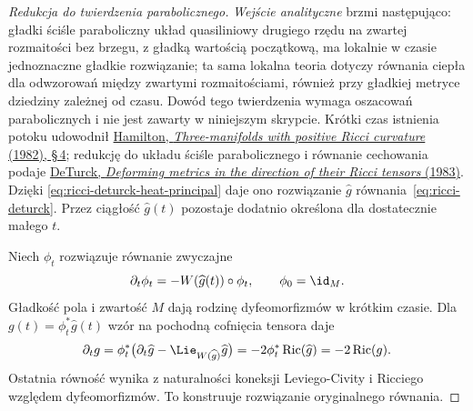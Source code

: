 \begin{proof}[Redukcja do twierdzenia parabolicznego]
\emph{Wejście analityczne} brzmi następująco: gładki
ściśle paraboliczny układ quasiliniowy drugiego rzędu
na zwartej rozmaitości bez brzegu, z gładką wartością
początkową, ma lokalnie w czasie jednoznaczne gładkie
rozwiązanie; ta sama lokalna teoria dotyczy równania
ciepła dla odwzorowań między zwartymi rozmaitościami,
również przy gładkiej metryce dziedziny zależnej od czasu.
Dowód tego twierdzenia wymaga oszacowań parabolicznych
i nie jest zawarty w niniejszym skrypcie. Krótki czas
istnienia potoku udowodnił
\href{https://projecteuclid.org/journals/journal-of-differential-geometry/volume-17/issue-2/Three-manifolds-with-positive-Ricci-curvature/10.4310/jdg/1214436922.full}
{Hamilton, \emph{Three-manifolds with positive Ricci
curvature} (1982), \S\,4}; redukcję do układu ściśle
parabolicznego i równanie cechowania podaje
\href{https://projecteuclid.org/journals/journal-of-differential-geometry/volume-18/issue-1/Deforming-metrics-in-the-direction-of-their-Ricci-tensors/10.4310/jdg/1214509286.full}
{DeTurck, \emph{Deforming metrics in the direction
of their Ricci tensors} (1983)}. Dzięki
\eqref{eq:ricci-deturck-heat-principal} daje ono
rozwiązanie $\widehat g$ równania~\eqref{eq:ricci-deturck}.
Przez ciągłość $\widehat g(t)$ pozostaje dodatnio
określona dla dostatecznie małego $t$.

Niech $\phi_t$ rozwiązuje równanie zwyczajne
\[
 \partial_t\phi_t=-W(\widehat g(t))\circ\phi_t,
 \qquad \phi_0=\id_M.
\]
Gładkość pola i zwartość $M$ dają rodzinę
dyfeomorfizmów w krótkim czasie. Dla
$g(t)=\phi_t^*\widehat g(t)$ wzór na pochodną
cofnięcia tensora daje
\[
 \partial_tg
 =\phi_t^*\bigl(\partial_t\widehat g
                  -\Lie_{W(\widehat g)}\widehat g\bigr)
 =-2\phi_t^*\operatorname{Ric}(\widehat g)
 =-2\operatorname{Ric}(g).
\]
Ostatnia równość wynika z naturalności koneksji
Leviego-Civity i Ricciego względem dyfeomorfizmów.
To konstruuje rozwiązanie oryginalnego równania.


\end{proof}
